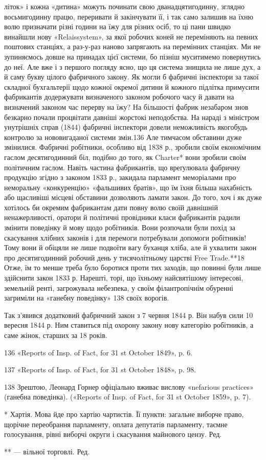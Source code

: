 літок» і кожна «дитина» можуть починати свою дванадцятигодинну,
зглядно восьмигодинну працю, переривати й закінчувати
її, і так само залишив на їхню волю призначати різні години
на їжу для різних осіб, то ці пани швидко винайшли нову
«Relaissystem», за якої робочих коней не переміняють на певних
поштових станціях, а раз-у-раз наново запрягають на перемінних
станціях. Ми не зупиняємось довше на принадах цієї
системи, бо пізніш муситимемо повернутись до неї. Але вже і з
першого погляду ясно, що ця система знищила не лише дух, а й
саму букву цілого фабричного закону. Як могли б фабричні
інспектори за такої складної бухгальтерії щодо кожної окремої
дитини й кожного підлітка примусити фабрикантів додержувати
визначеного законом робочого часу й давати на визначений законом
час перерву на їжу? На більшості фабрик незабаром знов
безкарно почали процвітати давніші жорстокі неподобства.
На нараді з міністром унутрішніх справ (1844) фабричні інспектори
довели неможливість якогобудь контролю за нововигаданої
системи змін.136 Але тимчасом обставини дуже змінилися. Фабричні
робітники, особливо від 1838 р., зробили своїм економічним гаслом
десятигодинний біл, подібно до того, як Charter* вони зробили своїм
політичним гаслом. Навіть частина фабрикантів, що вреґулювала
фабричну продукцію згідно з законом 1833 р., закидала парламент
меморіалами про неморальну «конкуренцію» «фальшивих братів»,
що їм їхня більша нахабність або щасливіші місцеві обставини
дозволяють ламати закон. До того, хоч і як дуже хотілось би
окремим фабрикантам дати повну волю своїй давнішній ненажерливості,
оратори й політичні провідники класи фабрикантів радили
змінити поведінку й мову щодо робітників. Вони розпочали
були похід за скасування хлібних законів і для перемоги потребували
допомоги робітників! Тому вони й обіцяли не лише подвоїти
вагу буханця хліба, але й ухвалити закон про десятигодинний
робочий день у тисячолітньому царстві Free Trade.**18
Отже, їм то менше треба було боротися проти тих заходів, що
повинні були лише здійснити закон 1833 р. Нарешті, торі, що їхньому
найсвятішому інтересові, земельній ренті, загрожувала
небезпека, у своїм філантропічнім обуренні загриміли на «ганебну
поведінку» 138 своїх ворогів.

Так з’явився додатковий фабричний закон з 7 червня 1844 р.
Він набув сили 10 вересня 1844 р. Ним ставиться під охорону закону
нову категорію робітників, а саме жінок, старших за 18 років.

136 «Reports of Insp. of Fact, for 31 st October 1849», p. 6.

137 «Reports of Insp. of Fact, for 31 st October 1848», p. 98.

138    Зрештою, Леонард Горнер офіціально вживає вислову «nefarious
practices» (ганебна поведінка). («Reports of Insp. of Fact, for 31 st
October 1859», p. 7).

* Хартія. Мова йде про хартію чартистів. Її пункти: загальне виборче
право, щорічне переобрання парламенту, оплата депутатів парламенту,
таємне голосування, рівні виборчі округи і скасування майнового
цензу. Ред.

** — вільної торговлі. Ред.

